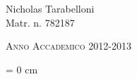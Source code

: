 \begin{titlepage}
\begin{adjustwidth}{-1 cm}{-1 cm}
\begin{spacing}{1.2}
 
 \hspace{8cm} \Large Nicholas Tarabelloni\\
 \hspace{8cm} \Large Matr. n. 782187 \\
 
 \end{spacing}


\centering
\large \textsc{Anno Accademico 2012-2013}

\end{adjustwidth}

\enlargethispage{3 cm}

\end{titlepage}

\thispagestyle{empty}

\cleardoublepage

\voffset = 0 cm


